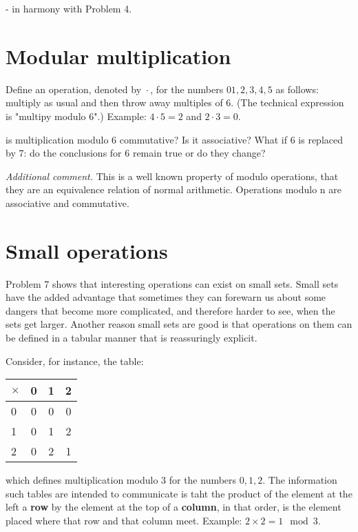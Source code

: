 - in harmony with Problem 4.


\section{Modular multiplication}

Define an operation, denoted by $\boxed{\cdot}$, for the numbers $01,2,3,4,5$ as follows: multiply as usual and then throw away multiples of 6. (The technical expression is "multipy modulo 6".) Example: $4 \boxed{\cdot} 5 = 2$ and $2 \boxed{\cdot} 3 = 0$.

\begin{problem}
is multiplication modulo 6 commutative? Is it associative? What if 6 is replaced by 7: do the conclusions for 6 remain true or do they change?
\end{problem}

\textit{Additional comment.} This is a well known property of modulo operations, that they are an equivalence relation of normal arithmetic. Operations modulo n are associative and commutative.

\section{Small operations}

Problem 7 shows that interesting operations can exist on small sets. Small sets have the added advantage that sometimes they can forewarn us about some dangers that become more complicated, and therefore harder to see, when the sets get larger. Another reason small sets are good is that operations on them can be defined in a tabular manner that is reassuringly explicit.

Consider, for instance, the table:

\begin{center}
    \begin{tabular}{l|ccc}
        $\times$ & 0 & 1 & 2 \\
        \hline
        0        & 0 & 0 & 0 \\
        1        & 0 & 1 & 2 \\
        2        & 0 & 2 & 1
    \end{tabular}
\end{center}

which defines multiplication modulo 3 for the numbers $0,1,2$. The information such tables are intended to communicate is taht the product of the element at the left a \textbf{row} by the element at the top of a \textbf{column}, in that order, is the element placed where that row and that column meet. Example: $2 \times 2 = 1 \mod 3$.

